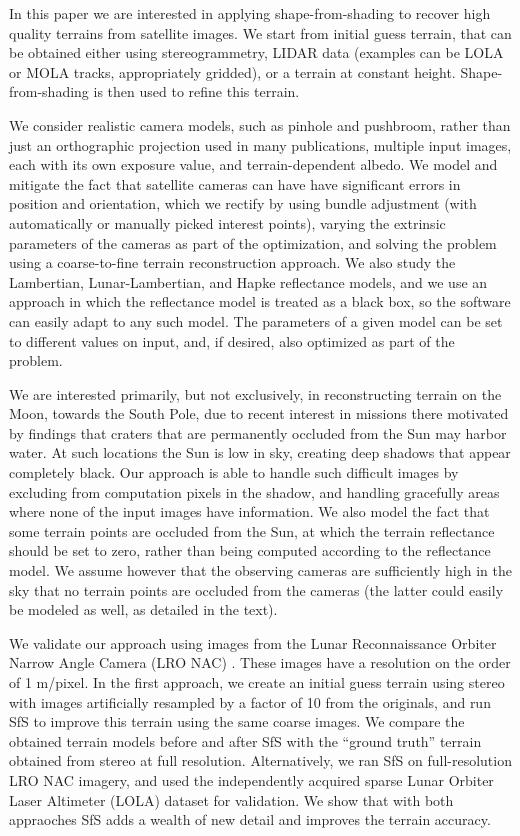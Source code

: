 \documentclass[12pt,oneside]{article}
\begin{document}
In this paper we are interested in applying shape-from-shading to
recover high quality terrains from satellite images. We start from
initial guess terrain, that can be obtained either using
stereogrammetry, LIDAR data (examples can be LOLA or MOLA tracks,
appropriately gridded), or a terrain at constant height. Shape-from-shading
is then used to refine this terrain.

We consider realistic camera models, such as pinhole and pushbroom,
rather than just an orthographic projection used in many publications,
multiple input images, each with its own exposure value, and
terrain-dependent albedo. We model and mitigate the fact that satellite
cameras can have have significant errors in position and orientation,
which we rectify by using bundle adjustment (with automatically
or manually picked interest points), varying the extrinsic parameters of
the cameras as part of the optimization, and solving the problem using
a coarse-to-fine terrain reconstruction approach.  We also study the
Lambertian, Lunar-Lambertian, and Hapke reflectance models, and we use
an approach in which the reflectance model is treated as a black box, so
the software can easily adapt to any such model. The parameters of a given model
can be set to different values on input, and, if desired, also optimized
as part of the problem. 

We are interested primarily, but not exclusively, in reconstructing
terrain on the Moon, towards the South Pole, due to recent interest in missions
there motivated by findings that craters that are permanently occluded
from the Sun may harbor water. At such locations the Sun is low in
sky, creating deep shadows that appear completely black. Our approach is
able to handle such difficult images by excluding from computation
pixels in the shadow, and handling gracefully areas where none of the
input images have information. We also model the fact that some terrain points are
occluded from the Sun, at which the terrain reflectance should be set to zero,
rather than being computed according to the reflectance model. We assume however that
the observing cameras are sufficiently high in the sky that no terrain
points are occluded from the cameras (the latter could easily be modeled
as well, as detailed in the text).

We validate our approach using images from the Lunar Reconnaissance
Orbiter Narrow Angle Camera (LRO NAC) \cite{robinson2010lunar}. These
images have a resolution on the order of 1 m/pixel.  In the first
approach, we create an initial guess terrain using stereo with images
artificially resampled by a factor of 10 from the originals, and run SfS
to improve this terrain using the same coarse images. We compare the
obtained terrain models before and after SfS with the ``ground truth''
terrain obtained from stereo at full resolution.  Alternatively, we ran
SfS on full-resolution LRO NAC imagery, and used the independently
acquired sparse Lunar Orbiter Laser Altimeter (LOLA) dataset
\cite{smith2010initial} for validation.  We show that with both
appraoches SfS adds a wealth of new detail and improves the terrain
accuracy.
\end{document}
